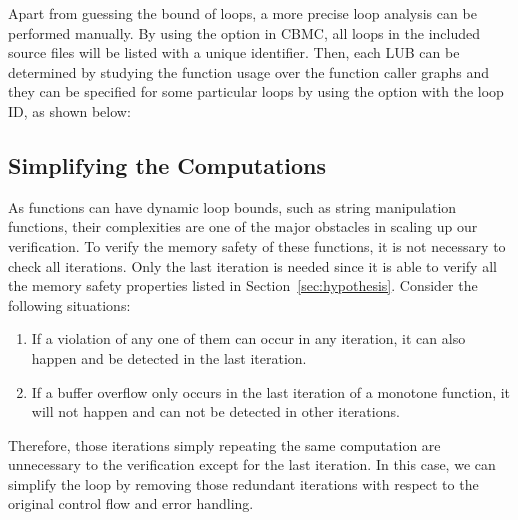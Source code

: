 Apart from guessing the bound of loops, a more precise loop analysis can be performed manually. By using the  option in CBMC, all loops in the included source files will be listed with a unique identifier. Then, each LUB can be determined by studying the function usage over the function caller graphs and they can be specified for some particular loops by using the  option with the loop ID, as shown below:


  


\subsection{Simplifying the Computations} \label{subsec:suc}
\label{sec:suc}
As functions can have dynamic loop bounds, such as string manipulation functions, their complexities are one of the major obstacles in scaling up our verification. To verify the memory safety of these functions, it is not necessary to check all iterations. Only the last iteration is needed since it is able to verify all the memory safety properties listed in Section~\ref{sec:hypothesis}. Consider the following situations:

\begin{enumerate}
    \item If a violation of any one of them can occur in any iteration, it can also happen and be detected in the last iteration.
    \item If a buffer overflow only occurs in the last iteration of a monotone function, it will not happen and can not be detected in other iterations.
\end{enumerate}

Therefore, those iterations simply repeating the same computation are unnecessary to the verification except for the last iteration. In this case, we can simplify the loop by removing those redundant iterations with respect to the original control flow and error handling. 

